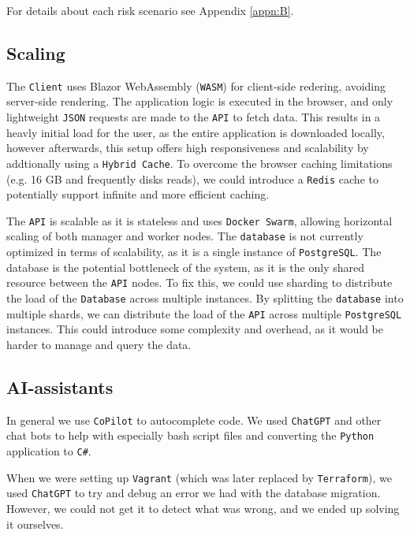 For details about each risk scenario see Appendix \ref{appn:B}.

\subsection{Scaling}
The \texttt{Client} uses Blazor WebAssembly (\texttt{WASM}) for client-side redering, 
avoiding server-side rendering.
The application logic is executed in the browser, and only lightweight 
\texttt{JSON} requests are made to the \texttt{API} to fetch data.
This results in a heavly initial load for the user, as the entire application is downloaded 
locally, however afterwards, 
this setup offers high responsiveness and scalability by addtionally using 
a \texttt{Hybrid Cache}.
To overcome the browser caching limitations (e.g. 16 GB and frequently disks 
reads), we could introduce a \texttt{Redis} cache to potentially support 
infinite and more efficient caching.

The \texttt{API} is scalable as it is stateless and uses \texttt{Docker Swarm}, 
allowing horizontal scaling of both manager and worker nodes.
The \texttt{database} is not currently optimized in terms of scalability, 
as it is a single instance of \texttt{PostgreSQL}.
The database is the potential bottleneck of the system, as it is the only shared 
resource between the \texttt{API} nodes.
To fix this, we could use sharding to distribute the load of the \texttt{Database} 
across multiple instances.
By splitting the \texttt{database} into multiple shards, we can distribute 
the load of the \texttt{API} across multiple \texttt{PostgreSQL} instances.
This could introduce some complexity and overhead, as it would be harder 
to manage and query the data.

\subsection{AI-assistants}

In general we use \texttt{CoPilot} to autocomplete code.
We used \texttt{ChatGPT} and other chat bots to help
with especially bash script files and converting 
the \texttt{Python} application to \texttt{C\#}.

When we were setting up \texttt{Vagrant} 
(which was later replaced by \texttt{Terraform}),
we used \texttt{ChatGPT} to try and debug an error we had with 
the database migration. However, we could not get it 
to detect what was wrong, and we ended up solving it ourselves.
